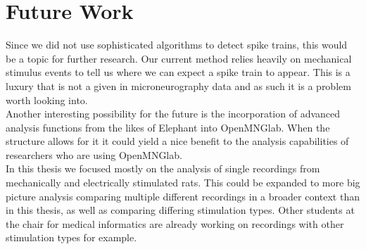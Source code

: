 \section{Future Work}
Since we did not use sophisticated algorithms to detect spike trains, this would be a topic for further research. Our current method relies heavily on mechanical stimulus events to tell us where we can expect a spike train to appear. This is a luxury that is not a given in microneurography data and as such it is a problem worth looking into.\\
Another interesting possibility for the future is the incorporation of advanced analysis functions from the likes of Elephant into OpenMNGlab. When the structure allows for it it could yield a nice benefit to the analysis capabilities of researchers who are using OpenMNGlab.\\
In this thesis we focused mostly on the analysis of single recordings from mechanically and electrically stimulated rats. This could be expanded to more big picture analysis comparing multiple different recordings in a broader context than in this thesis, as well as comparing differing stimulation types. Other students at the chair for medical informatics are already working on recordings with other stimulation types for example.\\





\cleardoublepage

